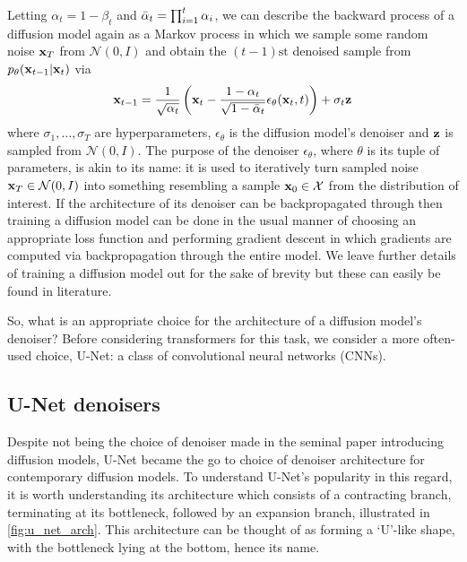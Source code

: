 \documentclass[11pt]{article}
\begin{document}
Letting $\alpha_t=1-\beta_t$ and $\Bar{\alpha}_t=\prod_{i=1}^t\alpha_i$, we can describe the backward process of a diffusion model again as a Markov process in which we sample some random noise $\mathbf{x}_T$ from $\mathcal{N}(0,I)$ and obtain the $(t-1){\text{st}}$ denoised sample from $p_{\theta}(\mathbf{x}_{t-1}|\mathbf{x}_t)$ via
$$
\mathbf{x}_{t-1}=\frac{1}{\sqrt{\alpha_t}}\left(\mathbf{x}_t-\frac{1-\alpha_t}{\sqrt
{1-\bar{\alpha}_t}}\epsilon_{\theta}(\mathbf{x}_t,t)\right)+\sigma_t\mathbf{z}
$$
where $\sigma_1,\dots,\sigma_T$ are hyperparameters, $\epsilon_{\theta}$ is the diffusion model's denoiser and $\mathbf{z}$ is sampled from $\mathcal{N}(0,I)$. %
The purpose of the denoiser $\epsilon_{\theta}$, where $\theta$ is its tuple of parameters, is akin to its name: it is used to iteratively turn sampled noise $\mathbf{x}_T\in\mathcal{N}(0,I)$ into something resembling a sample $\mathbf{x}_0\in\mathcal{X}$ from the distribution of interest. If the architecture of its denoiser can be backpropagated through then training a diffusion model can be done in the usual manner of choosing an appropriate loss function and performing gradient descent in which gradients are computed via backpropagation through the entire model. We leave further details of training a diffusion model out for the sake of brevity but these can easily be found in literature.

So, what is an appropriate choice for the architecture of a diffusion model's denoiser? Before considering transformers for this task, we consider a more often-used choice, U-Net: a class of convolutional neural networks (CNNs).

\subsection{U-Net denoisers}
Despite not being the choice of denoiser made in the seminal paper introducing diffusion models, U-Net became the go to choice of denoiser architecture for contemporary diffusion models. To understand U-Net's popularity in this regard, it is worth understanding its architecture which consists of a contracting branch, terminating at its bottleneck, followed by an expansion branch, illustrated in \autoref{fig:u_net_arch}. This architecture can be thought of as forming a `U'-like shape, with the bottleneck lying at the bottom, hence its name.
\end{document}

